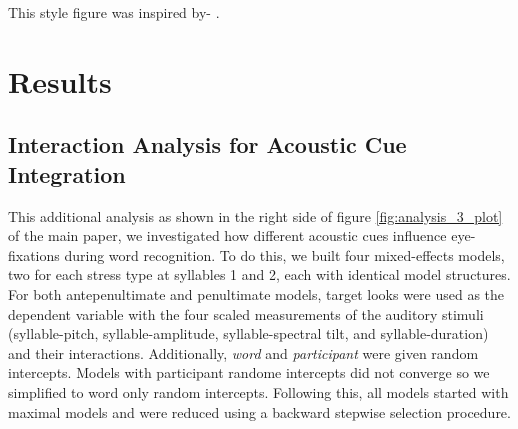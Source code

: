 \documentclass[sn-apa]{sn-jnl} %
\begin{document}
This style figure was inspired by-  \cite{bramlett2023}. 

\section{Results}

\subsection{Interaction Analysis for Acoustic Cue Integration}

This additional analysis as shown in the right side of figure \ref{fig:analysis_3_plot} of the main paper, we investigated how different acoustic cues influence eye-fixations during word recognition. To do this, we built four mixed-effects models, two for each stress type at syllables 1 and 2, each with identical model structures. For both antepenultimate and penultimate models, target looks were used as the dependent variable with the four scaled measurements of the auditory stimuli (syllable-pitch, syllable-amplitude, syllable-spectral tilt, and syllable-duration) and their interactions. Additionally, \textit{word} and \textit{participant} were given random intercepts. Models with participant randome intercepts did not converge so we simplified to word only random intercepts. Following this, all models started with maximal models and were reduced using a backward stepwise selection procedure. 
\end{document}

